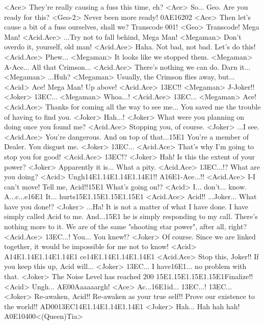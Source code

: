 <Ace> They're really causing a fuss this time, eh? 
<Ace> So... Geo. 
Are you ready for this? 
<Geo-2> Never been more ready! 
{0A}{E1}{62}{02} 
<Ace> Then let's cause a bit of a fuss ourselves, shall we? 
Transcode 001! 
<Geo> Transcode! Mega Man! 
<Acid.Ace> ...Try not to fall behind, Mega Man! 
<Megaman> Don't overdo it, yourself, old man! 
<Acid.Ace> Haha. Not bad, not bad. 
Let's do this! 
<Acid.Ace> Phew... 
<Megaman> It looks like we stopped them. 
<Megaman> A-Ace... All that Crimson... 
<Acid.Ace> There's nothing we can do. 
Darn it... 
<Megaman> ...Huh? 
<Megaman> Usually, the Crimson flies away, but... 
<Acid> Ace! Mega Man! Up above! 
<Acid.Ace> {13}{EC}!! 
<Megaman> J-Joker!! 
<Joker> {13}{EC}... 
<Megaman> Whoa...! 
<Acid.Ace> {13}{EC}... 
<Megaman> Ace! 
<Acid.Ace> Thanks for coming all the way to see me... 
You saved me the trouble of having to find you. 
<Joker> Hah...! 
<Joker> What were you planning on doing once you found me? 
<Acid.Ace> Stopping you, of course. 
<Joker> ...I see. 
<Acid.Ace> You're dangerous. 
And on top of that...{15}{E1} You're a member of Dealer. 
You disgust me. 
<Joker> {13}{EC}... 
<Acid.Ace> That's why I'm going to stop you for good! 
<Acid.Ace> {13}{EC}!? 
<Joker> Hah! 
Is this the extent of your power? 
<Joker> Apparently it is... What a pity. 
<Acid.Ace> {13}{EC}...!? 
What are you doing? 
<Acid> Ungh{14}{E1}.{14}{E1}.{14}{E1}.{14}{E1}!! 
A{16}{E1}-Ace...!! 
<Acid.Ace> I-I can't move! 
Tell me, Acid!!{15}{E1} What's going on!? 
<Acid> I... don't... know. 
A...c...e{16}{E1} It... hurts{15}{E1}.{15}{E1}.{15}{E1}.{15}{E1} 
<Acid.Ace> Acid!! 
...Joker... What have you done!? 
<Joker> ...Ha! 
It is not a matter of what I have done. 
I have simply called Acid to me. 
And...{15}{E1} he is simply responding to my call. 
There's nothing more to it. 
We are of the same "shooting star power", after all, right? 
<Acid.Ace> {13}{EC}...! 
You... You knew!? 
<Joker> Of course. 
Since we are linked together, it would be impossible for me not to know! 
<Acid> A{14}{E1}.{14}{E1}.{14}{E1}.{14}{E1} ce{14}{E1}.{14}{E1}.{14}{E1}.{14}{E1} 
<Acid.Ace> Stop this, Joker!! 
If you keep this up, Acid will... 
<Joker> {13}{EC}... 
I have{16}{E1}... no problem with that. 
<Joker> The Noise Level has reached 200%
{15}{E1}.{15}{E1}.{15}{E1}.{15}{E1}Finalize!! 
<Acid> Ungh... 
{AE}{00}Aaaaaargh! 
<Ace> Ac...{16}{E1}id... 
{13}{EC}...! 
{13}{EC}... 
<Joker> Re-awaken, Acid!! 
Re-awaken as your true self!! 
Prove our existence to the world!! 
{AD}{00}{13}{EC}{14}{E1}.{14}{E1}.{14}{E1}.{14}{E1} 
<Joker> Hah... 
Hah hah hah! 
{A0}{E1}{04}{00}<(Queen)Tia> 
